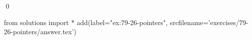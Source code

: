 
\begin{ex}
  \label{ex:79-26-pointers}
  
  \qed
\end{ex}
\begin{python0}
from solutions import *
add(label="ex:79-26-pointers",
    srcfilename='exercises/79-26-pointers/answer.tex')
\end{python0}
